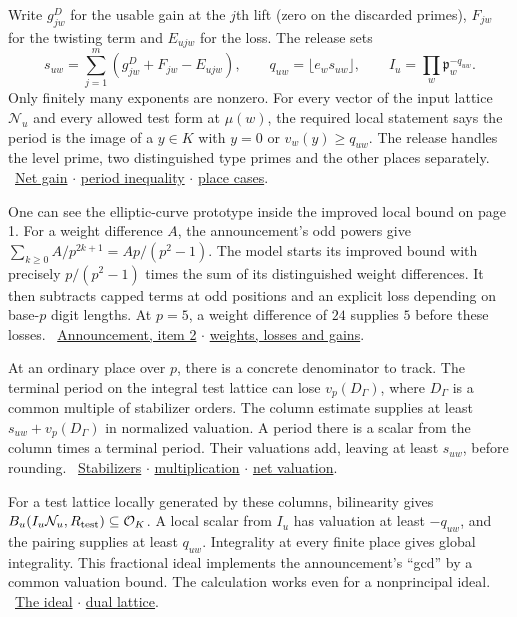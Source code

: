 \documentclass[11pt,letterpaper]{article}
\newcommand{\subhead}[1]{\par\addvspace{4pt}{\sffamily\bfseries\large\color{accent}#1\par}\nobreak\vspace{-2pt}}
\newcommand{\links}[1]{\unskip\ {\small\sffamily\color{muted}#1}}
\newcommand{\repo}{https://github.com/TomasOrtega/RH/blob/a6ac91a412dcbaab31801355ec5707024a71bf65/extracted/lean/src/}
\newcommand{\src}[3]{\href{\repo#1.lean\#L#2}{#3}}
\newcommand{\growth}{Formalism/SharpRestriction/GrowthBounds/}
\newcommand{\latt}{Formalism/LocalToGlobal/GroupLattices/}
\newcommand{\NN}{\mathcal N}
\newcommand{\OO}{\mathcal O}
\newcommand{\pp}{\mathfrak p}
\begin{document}
\subhead{From a valuation to a fractional ideal}
Write \(g^D_{jw}\) for the usable gain at the \(j\)th lift (zero on the discarded primes), \(F_{jw}\) for the twisting term and \(E_{ujw}\) for the loss. The release sets
\[
 s_{uw}=\sum_{j=1}^{m}(g^D_{jw}+F_{jw}-E_{ujw}),\qquad
 q_{uw}=\lfloor e_w s_{uw}\rfloor,\qquad
 I_u=\prod_w\pp_w^{-q_{uw}} .
\]
Only finitely many exponents are nonzero. For every vector of the input lattice \(\NN_u\) and every allowed test form at \(\mu(w)\), the required local statement says the period is the image of a \(y\in K\) with \(y=0\) or \(v_w(y)\ge q_{uw}\). The release handles the level prime, two distinguished type primes and the other places separately. \links{\src{Formalism/LocalRingCardinality/DataParams\%E2\%82\%82}{212}{Net gain} $\cdot$ \src{Formalism/SharpRestriction/Divisibility/LocalQuadraticParts}{206}{period inequality} $\cdot$ \src{\latt AdmissibleAtGeneratorPlaces}{214}{place cases}.}

One can see the elliptic-curve prototype inside the improved local bound on page 1. For a weight difference \(A\), the announcement's odd powers give \(\sum_{k\ge0}A/p^{2k+1}=Ap/(p^2-1)\). The model starts its improved bound with precisely \(p/(p^2-1)\) times the sum of its distinguished weight differences. It then subtracts capped terms at odd positions and an explicit loss depending on base-\(p\) digit lengths. At \(p=5\), a weight difference of \(24\) supplies \(5\) before these losses. \links{\href{https://alpo.ge/remark.pdf\#page=3}{Announcement, item 2} $\cdot$ \src{\growth FormalGroupSystem}{44}{weights, losses and gains}.}

At an ordinary place over \(p\), there is a concrete denominator to track. The terminal period on the integral test lattice can lose \(v_p(D_\Gamma)\), where \(D_\Gamma\) is a common multiple of stabilizer orders. The column estimate supplies at least \(s_{uw}+v_p(D_\Gamma)\) in normalized valuation. A period there is a scalar from the column times a terminal period. Their valuations add, leaving at least \(s_{uw}\), before rounding. \links{\src{Formalism/LocalRingCardinality/DataErr}{71}{Stabilizers} $\cdot$ \src{\latt AdmissibleAtGeneratorPlaces}{72}{multiplication} $\cdot$ \src{\latt AdmissibleAtGeneratorPlaces}{187}{net valuation}.}

For a test lattice locally generated by these columns, bilinearity gives \(B_u(I_u\NN_u,R_{\rm test})\subseteq\OO_K\). A local scalar from \(I_u\) has valuation at least \(-q_{uw}\), and the pairing supplies at least \(q_{uw}\). Integrality at every finite place gives global integrality. This fractional ideal implements the announcement's “gcd” by a common valuation bound. The calculation works even for a nonprincipal ideal. \links{\src{Formalism/LocalRingCardinality/DataDIVDefs}{15}{The ideal} $\cdot$ \src{Formalism/QuotientMetricDivisors/DivIntoDualShift}{133}{dual lattice}.}
\end{document}
